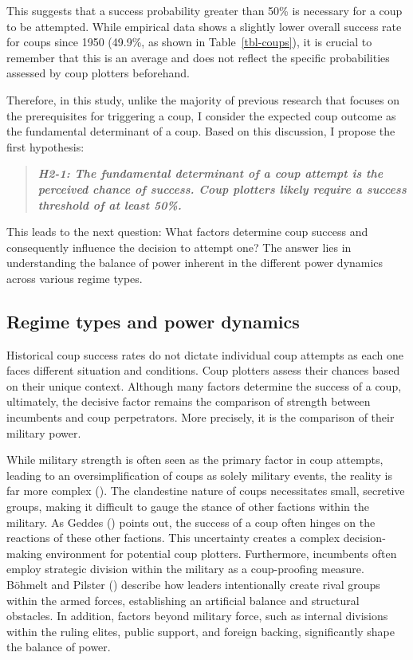 \documentclass[
  12pt,
]{report}
\begin{document}
This suggests that a success probability greater than 50\% is necessary
for a coup to be attempted. While empirical data shows a slightly lower
overall success rate for coups since 1950 (49.9\%, as shown in
Table~\ref{tbl-coups}), it is crucial to remember that this is an
average and does not reflect the specific probabilities assessed by coup
plotters beforehand.

Therefore, in this study, unlike the majority of previous research that
focuses on the prerequisites for triggering a coup, I consider the
expected coup outcome as the fundamental determinant of a coup. Based on
this discussion, I propose the first hypothesis:

\begin{quote}
\textbf{\emph{H2-1: The fundamental determinant of a coup attempt is the
perceived chance of success. Coup plotters likely require a success
threshold of at least 50\%.}}
\end{quote}

This leads to the next question: What factors determine coup success and
consequently influence the decision to attempt one? The answer lies in
understanding the balance of power inherent in the different power
dynamics across various regime types.

\subsection{Regime types and power
dynamics}\label{regime-types-and-power-dynamics}

Historical coup success rates do not dictate individual coup attempts as
each one faces different situation and conditions. Coup plotters assess
their chances based on their unique context. Although many factors
determine the success of a coup, ultimately, the decisive factor remains
the comparison of strength between incumbents and coup perpetrators.
More precisely, it is the comparison of their military power.

While military strength is often seen as the primary factor in coup
attempts, leading to an oversimplification of coups as solely military
events, the reality is far more complex (). The clandestine nature of coups necessitates small, secretive
groups, making it difficult to gauge the stance of other factions within
the military. As Geddes () points out,
the success of a coup often hinges on the reactions of these other
factions. This uncertainty creates a complex decision-making environment
for potential coup plotters. Furthermore, incumbents often employ
strategic division within the military as a coup-proofing measure.
Böhmelt and Pilster () describe how
leaders intentionally create rival groups within the armed forces,
establishing an artificial balance and structural obstacles. In
addition, factors beyond military force, such as internal divisions
within the ruling elites, public support, and foreign backing,
significantly shape the balance of power.
\end{document}
